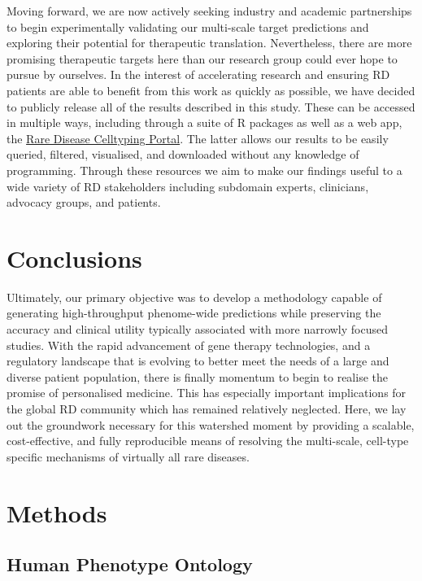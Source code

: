 \documentclass[
]{report}
\begin{document}
Moving forward, we are now actively seeking industry and academic
partnerships to begin experimentally validating our multi-scale target
predictions and exploring their potential for therapeutic translation.
Nevertheless, there are more promising therapeutic targets here than our
research group could ever hope to pursue by ourselves. In the interest
of accelerating research and ensuring RD patients are able to benefit
from this work as quickly as possible, we have decided to publicly
release all of the results described in this study. These can be
accessed in multiple ways, including through a suite of R packages as
well as a web app, the
\href{https://neurogenomics.github.io/rare_disease_celltyping_apps/home/}{Rare
Disease Celltyping Portal}. The latter allows our results to be easily
queried, filtered, visualised, and downloaded without any knowledge of
programming. Through these resources we aim to make our findings useful
to a wide variety of RD stakeholders including subdomain experts,
clinicians, advocacy groups, and patients.

\section{Conclusions}\label{sec-conclusions}

Ultimately, our primary objective was to develop a methodology capable
of generating high-throughput phenome-wide predictions while preserving
the accuracy and clinical utility typically associated with more
narrowly focused studies. With the rapid advancement of gene therapy
technologies, and a regulatory landscape that is evolving to better meet
the needs of a large and diverse patient population, there is finally
momentum to begin to realise the promise of personalised medicine. This
has especially important implications for the global RD community which
has remained relatively neglected. Here, we lay out the groundwork
necessary for this watershed moment by providing a scalable,
cost-effective, and fully reproducible means of resolving the
multi-scale, cell-type specific mechanisms of virtually all rare
diseases.

\section{Methods}\label{sec-methods}

\subsection{Human Phenotype Ontology}\label{human-phenotype-ontology}
\end{document}
